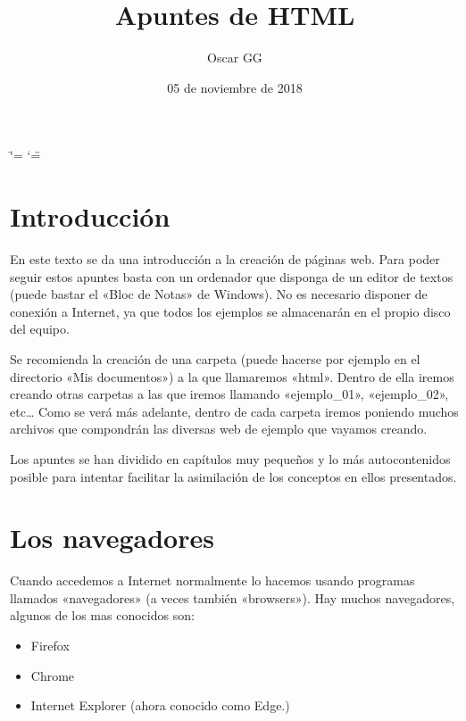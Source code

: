 \documentclass[letterpaper,10pt,spanish]{sphinxmanual}
\title{Apuntes de HTML }
\date{05 de noviembre de 2018}
\author{Oscar GG}
\begin{document}
\ifdefined\shorthandoff
  \ifnum\catcode`\=\string=\active\shorthandoff{=}\fi
  \ifnum\catcode`\"=\active{}\fi
\fi

\pagestyle{empty}
\maketitle
\pagestyle{plain}
\sphinxtableofcontents
\pagestyle{normal}
\label{\detokenize{index::doc}}



\chapter{Introducción}
\label{\detokenize{index:introduccion}}
En este texto se da una introducción  a la creación de páginas web. Para poder seguir estos apuntes basta con un ordenador que disponga de un editor de textos (puede bastar el «Bloc de Notas» de Windows). No es necesario disponer de conexión a Internet, ya que todos los ejemplos se almacenarán en el propio disco del equipo.

Se recomienda la creación de una carpeta (puede hacerse por ejemplo en el directorio «Mis documentos») a la que llamaremos «html». Dentro de ella iremos creando otras carpetas a las que iremos llamando «ejemplo\_01», «ejemplo\_02», etc… Como se verá más adelante, dentro de cada carpeta iremos poniendo muchos archivos que compondrán las diversas web de ejemplo que vayamos creando.

Los apuntes se han dividido en capítulos muy pequeños y lo más autocontenidos posible para intentar facilitar la asimilación de los conceptos en ellos presentados.


\chapter{Los navegadores}
\label{\detokenize{index:los-navegadores}}
Cuando accedemos a Internet normalmente lo hacemos usando programas llamados «navegadores» (a veces también «browsers»). Hay muchos navegadores, algunos de los mas conocidos son:
\begin{itemize}
\item {} 
Firefox

\item {} 
Chrome

\item {} 
Internet Explorer (ahora conocido como Edge.)

\end{itemize}
\end{document}
